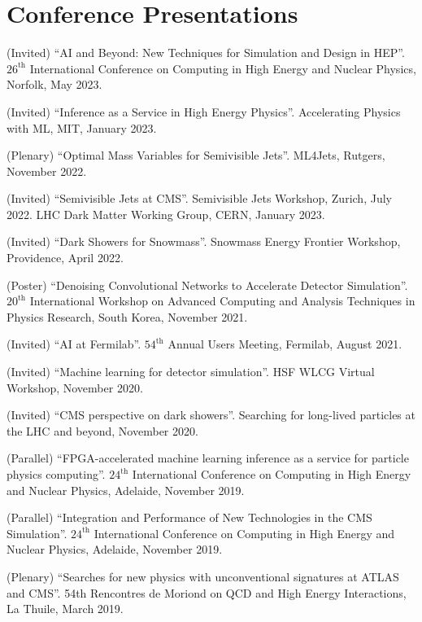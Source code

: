 \section{Conference Presentations}
\begin{description}[leftmargin=12pt,font=\normalfont,labelsep=0em]
\item (Invited) ``AI and Beyond: New Techniques for Simulation and Design in HEP''. $26^{\text{th}}$ International Conference on Computing in High Energy and Nuclear Physics, Norfolk, May 2023.
\item (Invited) ``Inference as a Service in High Energy Physics''. Accelerating Physics with ML, MIT, January 2023.
\item (Plenary) ``Optimal Mass Variables for Semivisible Jets''. ML4Jets, Rutgers, November 2022.
\item (Invited) ``Semivisible Jets at CMS''. Semivisible Jets Workshop, Zurich, July 2022. LHC Dark Matter Working Group, CERN, January 2023.
\item (Invited) ``Dark Showers for Snowmass''. Snowmass Energy Frontier Workshop, Providence, April 2022.
\item (Poster) ``Denoising Convolutional Networks to Accelerate Detector Simulation''. $20^{\text{th}}$ International Workshop on Advanced Computing and Analysis Techniques in Physics Research, South Korea, November 2021.
\item (Invited) ``AI at Fermilab''. $54^{\text{th}}$ Annual Users Meeting, Fermilab, August 2021.
\item (Invited) ``Machine learning for detector simulation''. HSF WLCG Virtual Workshop, November 2020.
\item (Invited) ``CMS perspective on dark showers''. Searching for long-lived particles at the LHC and beyond, November 2020.
\item (Parallel) ``FPGA-accelerated machine learning inference as a service for particle physics computing''. $24^{\text{th}}$ International Conference on Computing in High Energy and Nuclear Physics, Adelaide, November 2019.
\item (Parallel) ``Integration and Performance of New Technologies in the CMS Simulation''. $24^{\text{th}}$ International Conference on Computing in High Energy and Nuclear Physics, Adelaide, November 2019.
\item (Plenary) ``Searches for new physics with unconventional signatures at ATLAS and CMS''. 54th Rencontres de Moriond on QCD and High Energy Interactions, La Thuile, March 2019.

\end{description}
